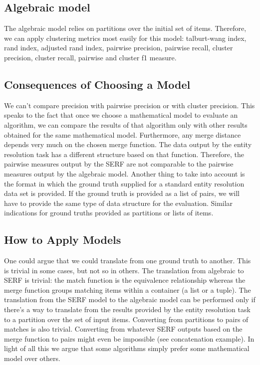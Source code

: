 \documentclass[11pt]{article}
\begin{document}
    \subsection[algebraic]{Algebraic model}
    The algebraic model relies on partitions over the initial set of items.
    Therefore, we can apply clustering metrics most easily for this model: talburt-wang index, rand index, adjusted rand
    index, pairwise precision, pairwise recall, cluster precision, cluster recall, pairwise and cluster f1 measure.

    \subsection[why-bother]{Consequences of Choosing a Model}
    We can't compare precision with pairwise precision or with cluster precision.
    This speaks to the fact that once we choose a mathematical model to evaluate an algorithm, we can compare the
    results of that algorithm only with other results obtained for the same mathematical model.
    Furthermore, any merge distance depends very much on the chosen merge function.
    The data output by the entity resolution task has a different structure based on that function.
    Therefore, the pairwise measures output by the SERF are not comparable to the pairwise measures output by the
    algebraic model.
    Another thing to take into account is the format in which the ground truth supplied for a standard entity resolution
    data set is provided.
    If the ground truth is provided as a list of pairs, we will have to provide the same type of data structure for the
    evaluation.
    Similar indications for ground truths provided as partitions or lists of items.

    \subsection[applying]{How to Apply Models}
    One could argue that we could translate from one ground truth to another.
    This is trivial in some cases, but not so in others.
    The translation from algebraic to SERF is trivial: the match function is the equivalence relationship whereas the
    merge function groups matching items within a container (a list or a tuple).
    The translation from the SERF model to the algebraic model can be performed only if there's a way to translate from
    the results provided by the entity resolution task to a partition over the set of input items.
    Converting from partitions to pairs of matches is also trivial.
    Converting from whatever SERF outputs based on the merge function to pairs might even be impossible (see
    concatenation example).
    In light of all this we argue that some algorithms simply prefer some mathematical model over others.
\end{document}
